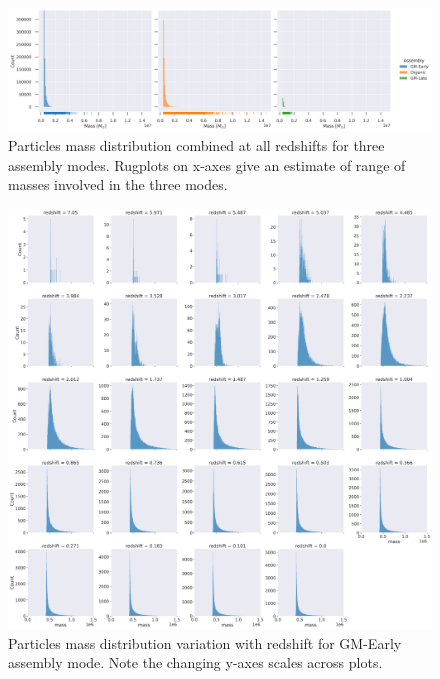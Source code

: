 \documentclass{article}
\begin{document}
	\begin{figure}
			\centering 
			\includegraphics[width=\columnwidth]{../../plots/mass_plotter/particle_mass_distribution.png}
			\caption{Particles mass distribution combined at all redshifts for three assembly modes. Rugplots on x-axes give an estimate of range of masses involved in the three modes.}
	\end{figure}

	\clearpage

	\begin{figure}
			\centering 
			\includegraphics[width=.9\columnwidth]{../../plots/mass_plotter/mass_distribution_wrt_redshift_GM-Early.png}
			\caption{Particles mass distribution variation with redshift for GM-Early assembly mode. Note the changing y-axes scales across plots.}
	\end{figure}

	\clearpage
\end{document}
